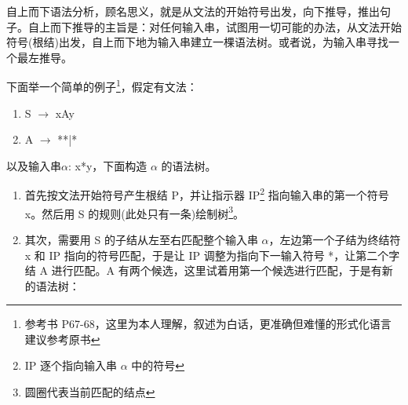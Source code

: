 自上而下语法分析，顾名思义，就是从文法的开始符号出发，向下推导，推出句子。自上而下推导的主旨是：对任何输入串，试图用一切可能的办法，从文法开始符号(根结)出发，自上而下地为输入串建立一棵语法树。或者说，为输入串寻找一个最左推导。

下面举一个简单的例子\footnote{参考书 P67-68，这里为本人理解，叙述为白话，更准确但难懂的形式化语言建议参考原书}，假定有文法：
\begin{enumerate}
    \item[(1)] S $\rightarrow$ xAy
    \item[(2)] A $\rightarrow$ **|*
\end{enumerate}

以及输入串$\alpha$: x*y，下面构造 $\alpha$ 的语法树。 

\begin{enumerate}
    \item 首先按文法开始符号产生根结 P，并让指示器 IP\footnote{IP 逐个指向输入串 $\alpha$ 中的符号} 指向输入串的第一个符号 x。然后用 S 的规则(此处只有一条)绘制树\footnote{圆圈代表当前匹配的结点}。
    \begin{figure}[H]
        \centering
    \end{figure}

    \item 其次，需要用 S 的子结从左至右匹配整个输入串 $\alpha$，左边第一个子结为终结符 x 和 IP 指向的符号匹配，于是让 IP 调整为指向下一输入符号 *，让第二个字结 A 进行匹配。A 有两个候选，这里试着用第一个候选进行匹配，于是有新的语法树：
    
    \begin{figure}[H]
        \centering
    \end{figure}


\end{enumerate}
